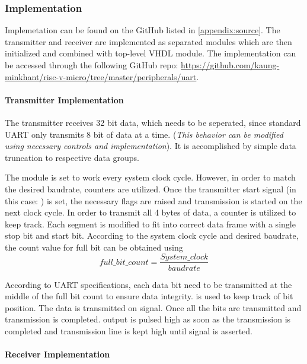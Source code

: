 
\newpage

\subsubsection{Implementation}
Implemetation can be found on the GitHub listed in \ref{appendix:source}.
The transmitter and receiver are implemented as separated modules which are then initialized and combined with top-level VHDL module. The implementation can be accessed through the following GitHub repo: \url{https://github.com/kaung-minkhant/risc-v-micro/tree/master/peripherals/uart}.
\paragraph*{Transmitter Implementation}
The transmitter receives 32 bit data, which needs to be seperated, since standard UART only transmits 8 bit of data at a time. (\textit{This behavior can be modified using necessary controls and implementation}). It is accomplished by simple data truncation to respective data groups.

The module is set to work every system clock cycle. However, in order to match the desired baudrate, counters are utilized. Once the transmitter start signal (in this case: ) is set, the necessary flags are raised and transmission is started on the next clock cycle. In order to transmit all 4 bytes of data, a counter  is utilized to keep track. Each segment is modified to fit into correct data frame with a single stop bit and start bit. According to the system clock cycle and desired baudrate, the count value for full bit can be obtained using $$ full\_bit\_count = \frac{System\_clock}{baudrate} $$

According to UART specifications, each data bit need to be transmitted at the middle of the full bit count to ensure data integrity.  is used to keep track of bit position. The data is transmitted on  signal. Once all the bits are transmitted and transmission is completed.  output is pulsed high as soon as the transmission is completed and transmission line is kept high until  signal is asserted.


\paragraph*{Receiver Implementation}

